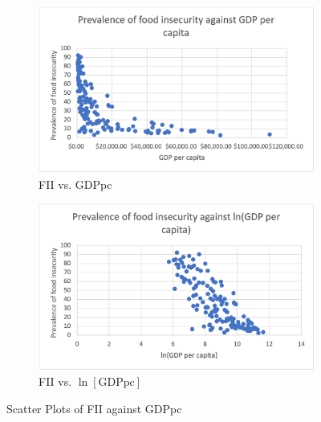 \documentclass{article}
\begin{document}
\begin{appendices}
\begin{figure}[H]
     \centering
     \begin{subfigure}[b]{0.475\textwidth}
         \centering
         \includegraphics[width=\textwidth]{Images/gdppc.png}
         \caption{FII vs. GDPpc}
         \label{fig:gdppcscatter}
     \end{subfigure}
     \hfill
     \begin{subfigure}[b]{0.475\textwidth}
         \centering
         \includegraphics[width=\textwidth]{Images/lngdppc.png}
         \caption{FII vs. $\ln{[\text{GDPpc}]}$}
         \label{fig:lggpdpcscatter}
     \end{subfigure}
    \caption{Scatter Plots of FII against GDPpc}
    \label{fig:scattergdppc}
\end{figure}


\end{appendices}
\end{document}
